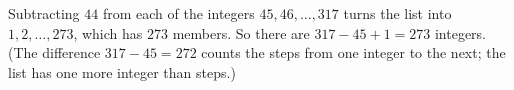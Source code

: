 Subtracting $44$ from each of the integers $45,46,\dots,317$ turns the list into $1,2,\dots,273$, which has $273$ members. So there are $317-45+1=\boxed{273}$ integers. (The difference $317-45=272$ counts the steps from one integer to the next; the list has one more integer than steps.)
